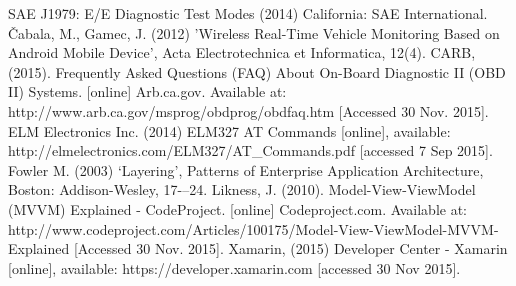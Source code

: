 \documentclass[12pt]{report}
\begin{document}
	
	\newpage	
	
	
	\begin{thebibliography}{9}
		 SAE J1979:  E/E Diagnostic Test Modes (2014) California: SAE International.		
		 {\v C}abala, M., Gamec, J. (2012) 'Wireless Real-Time Vehicle Monitoring Based on Android Mobile Device', Acta Electrotechnica et Informatica, 12(4).
		 CARB, (2015). Frequently Asked Questions (FAQ) About On-Board Diagnostic II (OBD II) Systems. [online] Arb.ca.gov. Available at: http://www.arb.ca.gov/msprog/obdprog/obdfaq.htm [Accessed 30 Nov. 2015].
		 ELM Electronics Inc. (2014) ELM327 AT Commands [online], available: 	http://elmelectronics.com/ELM327/AT{\_}Commands.pdf [accessed 7 Sep 2015].
		 Fowler M. (2003) ‘Layering’, Patterns of Enterprise
	Application Architecture, Boston: Addison-Wesley, 17{-–}24.
		 Likness, J. (2010). Model-View-ViewModel (MVVM) Explained - CodeProject. [online] Codeproject.com. Available at: http://www.codeproject.com/Articles/100175/Model-View-ViewModel-MVVM-Explained [Accessed 30 Nov. 2015].
		 Xamarin, (2015) Developer Center - Xamarin [online], available: https://developer.xamarin.com [accessed 30 Nov 2015].
	\end{thebibliography}	
	\newpage
\end{document}
